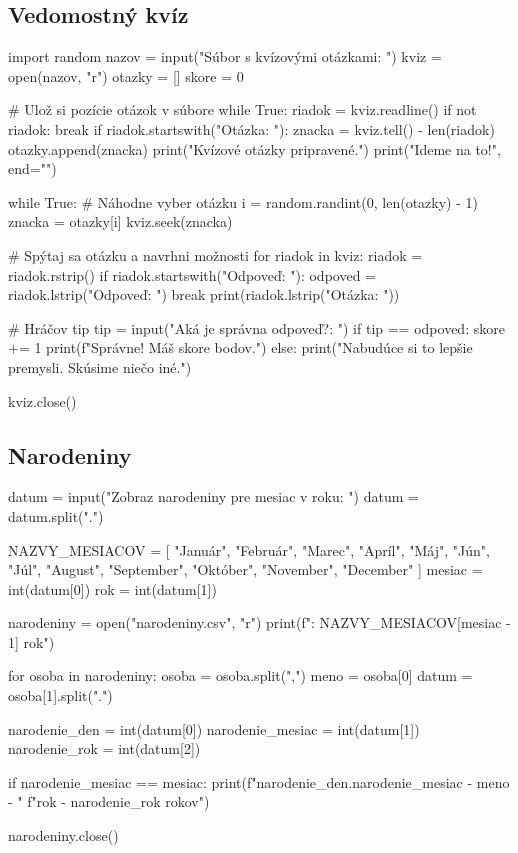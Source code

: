 \subsection{Vedomostný kvíz}
\begin{solution}
import random
nazov = input("Súbor s kvízovými otázkami: ")
kviz = open(nazov, "r")
otazky = []
skore = 0

# Ulož si pozície otázok v súbore
while True:
    riadok = kviz.readline()
    if not riadok:
        break
    if riadok.startswith("Otázka: "):
        znacka = kviz.tell() - len(riadok)
        otazky.append(znacka)
print("Kvízové otázky pripravené.")
print("Ideme na to!", end="\n\n")

while True:
    # Náhodne vyber otázku
    i = random.randint(0, len(otazky) - 1)
    znacka = otazky[i]
    kviz.seek(znacka)

    # Spýtaj sa otázku a navrhni možnosti
    for riadok in kviz:
        riadok = riadok.rstrip()
        if riadok.startswith("Odpoveď: "):
            odpoved = riadok.lstrip("Odpoveď: ")
            break
        print(riadok.lstrip("Otázka: "))

    # Hráčov tip
    tip = input("Aká je správna odpoveď?: ")
    if tip == odpoved:
        skore += 1
        print(f"Správne! Máš {skore} bodov.\n")
    else:
        print("Nabudúce si to lepšie premysli. Skúsime niečo iné.\n")

kviz.close()
\end{solution}


\subsection{Narodeniny}
\begin{solution}
datum = input("Zobraz narodeniny pre mesiac v roku: ")
datum = datum.split(".")

NAZVY_MESIACOV = [
	"Január", "Február", "Marec", "Apríl", "Máj", "Jún", "Júl",
	"August", "September", "Október", "November", "December"
]
mesiac = int(datum[0])
rok = int(datum[1])

narodeniny = open("narodeniny.csv", "r")
print(f"\nNarodeniny: {NAZVY_MESIACOV[mesiac - 1]} {rok}")

for osoba in narodeniny:
    osoba = osoba.split(",")
    meno = osoba[0]
    datum = osoba[1].split(".")

    narodenie_den = int(datum[0])
    narodenie_mesiac = int(datum[1])
    narodenie_rok = int(datum[2])

    if narodenie_mesiac == mesiac:
        print(f"{narodenie_den}.{narodenie_mesiac} - {meno} - "
              f"{rok - narodenie_rok} rokov")

narodeniny.close()
\end{solution}


